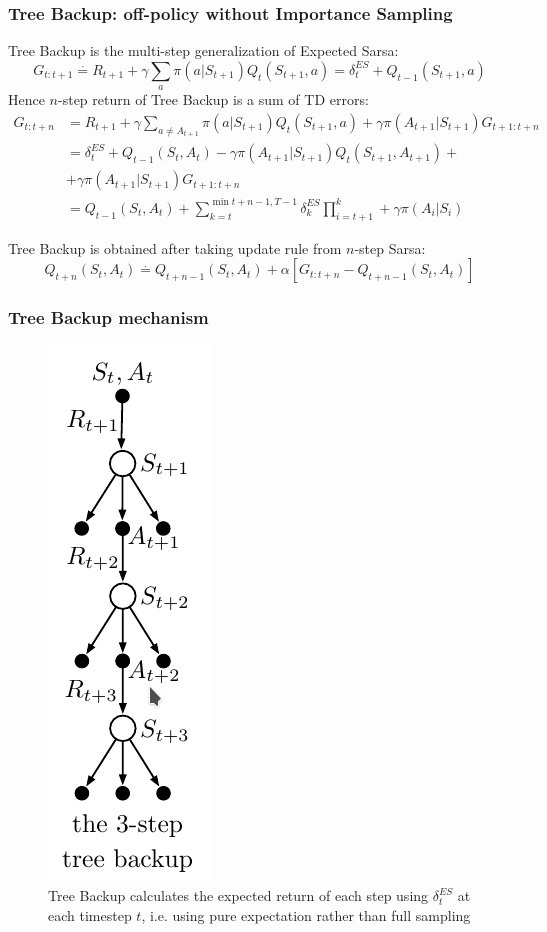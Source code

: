 \documentclass{beamer}
\begin{document}
\begin{frame}
  \frametitle{Tree Backup: off-policy without Importance Sampling}
  Tree Backup is the multi-step generalization of Expected Sarsa:
  $$G_{t : t + 1} \overset{\cdot}{=} R_{t + 1} +
      \gamma \sum_{a} \pi(a | S_{t + 1}) Q_t(S_{t + 1}, a) = \delta^{ES}_t
        + Q_{t - 1}(S_{t + 1}, a)$$
  Hence $n$-step return of Tree Backup is a sum of TD errors:
  \begin{align*}
    G_{t : t + n}
      &=
      R_{t + 1} + \gamma \sum_{a \neq A_{t + 1}} \pi(a | S_{t + 1})
        Q_t(S_{t + 1}, a) + \gamma \pi(A_{t + 1} | S_{t + 1}) G_{t + 1 : t + n}
      \\
      &= \delta_t^{ES} + Q_{t - 1} (S_t, A_t) - \gamma
        \pi(A_{t + 1} | S_{t + 1}) Q_t(S_{t + 1}, A_{t + 1}) +
      \\
      &+ \gamma \pi(A_{t + 1} | S_{t + 1}) G_{t + 1 : t + n}
      \\
      &= Q_{t -1}(S_t, A_t) +
      \sum_{k = t}^{\min{t + n - 1, T - 1}} \delta_k^{ES} \prod_{i = t + 1}^k +
      \gamma \pi(A_i | S_i)
  \end{align*}

  Tree Backup is obtained after taking update rule from $n$-step Sarsa:
  $$Q_{t + n}(S_t, A_t) \overset{\cdot}{=} Q_{t + n - 1}(S_t, A_t) +
    \alpha[G_{t : t + n} - Q_{t + n -1}(S_t, A_t)]$$
\end{frame}

\begin{frame}
  \frametitle{Tree Backup mechanism}
  \begin{figure}
    \centering
    \includegraphics[height=0.7 \textheight]{tree_backup}
    \caption{Tree Backup calculates the expected return of each step using
      $\delta_t^{ES}$ at each timestep $t$, i.e. using pure expectation rather
      than full sampling}
  \end{figure}
\end{frame}
\end{document}
